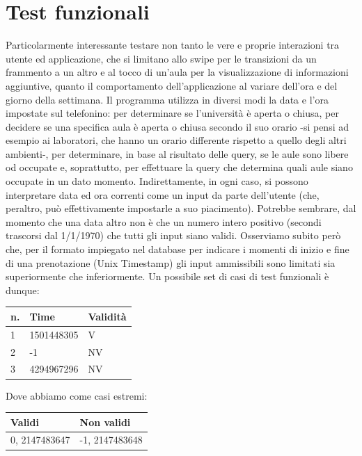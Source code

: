 \documentclass{article}
\begin{document}
	\part{Test funzionali}
	Particolarmente interessante testare non tanto le vere e proprie interazioni tra utente ed applicazione, che si limitano allo swipe per le transizioni da un frammento a un altro e al tocco di un'aula per la visualizzazione di informazioni aggiuntive, quanto il comportamento dell'applicazione al variare dell'ora e del giorno della settimana. Il programma utilizza in diversi modi la data e l'ora impostate sul telefonino: per determinare se l'università è aperta o chiusa, per decidere se una specifica aula è aperta o chiusa secondo il suo orario -si pensi ad esempio ai laboratori, che hanno un orario differente rispetto a quello degli altri ambienti-, per determinare, in base al risultato delle query, se le aule sono libere od occupate e, soprattutto, per effettuare la query che determina quali aule siano occupate in un dato momento. Indirettamente, in ogni caso, si possono interpretare data ed ora correnti come un input da parte dell'utente (che, peraltro, può effettivamente impostarle a suo piacimento). Potrebbe sembrare, dal momento che una data altro non è che un numero intero positivo (secondi trascorsi dal 1/1/1970) che tutti gli input siano validi. Osserviamo subito però che, per il formato impiegato nel database per indicare i momenti di inizio e fine di una prenotazione (Unix Timestamp) gli input ammissibili sono limitati sia superiormente che inferiormente.
	Un possibile set di casi di test funzionali è dunque:\\
	
\begin{table}[h]
	\centering
	\label{my-label}
	\begin{tabular}{|l|l|l|}
		\hline
		n. & Time       & Validità \\ \hline
		1  & 1501448305 & V        \\ \hline
		2  & -1         & NV       \\ \hline
		3  & 4294967296 & NV       \\ \hline
	\end{tabular}
	
\end{table}

Dove abbiamo come casi estremi:

\begin{table}[h]
	\centering
	\label{my-label}
	\begin{tabular}{|l|l|}
		\hline
		Validi        & Non validi     \\ \hline
		0, 2147483647 & -1, 2147483648 \\ \hline
	\end{tabular}
\end{table}
\end{document}
